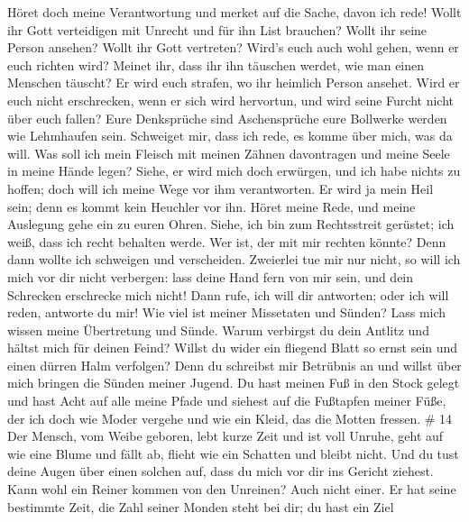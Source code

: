 Höret doch meine Verantwortung und merket auf die Sache,
davon ich rede!  Wollt ihr Gott verteidigen mit Unrecht und
für ihn List brauchen?  Wollt ihr seine Person ansehen?
Wollt ihr Gott vertreten?  Wird's euch auch wohl gehen, wenn
er euch richten wird? Meinet ihr, dass ihr ihn täuschen werdet, wie man
einen Menschen täuscht?  Er wird euch strafen, wo ihr
heimlich Person ansehet.  Wird er euch nicht erschrecken,
wenn er sich wird hervortun, und wird seine Furcht nicht über euch
fallen?  Eure Denksprüche sind Aschensprüche eure Bollwerke
werden wie Lehmhaufen sein.  Schweiget mir, dass ich rede,
es komme über mich, was da will.  Was soll ich mein Fleisch
mit meinen Zähnen davontragen und meine Seele in meine Hände legen?
 Siehe, er wird mich doch erwürgen, und ich habe nichts zu
hoffen; doch will ich meine Wege vor ihm verantworten.  Er
wird ja mein Heil sein; denn es kommt kein Heuchler vor ihn.
 Höret meine Rede, und meine Auslegung gehe ein zu euren
Ohren.  Siehe, ich bin zum Rechtsstreit gerüstet; ich weiß,
dass ich recht behalten werde.  Wer ist, der mit mir
rechten könnte? Denn dann wollte ich schweigen und verscheiden.
 Zweierlei tue mir nur nicht, so will ich mich vor dir
nicht verbergen:  lass deine Hand fern von mir sein, und
dein Schrecken erschrecke mich nicht!  Dann rufe, ich will
dir antworten; oder ich will reden, antworte du mir!  Wie
viel ist meiner Missetaten und Sünden? Lass mich wissen meine
Übertretung und Sünde.  Warum verbirgst du dein Antlitz und
hältst mich für deinen Feind?  Willst du wider ein fliegend
Blatt so ernst sein und einen dürren Halm verfolgen?  Denn
du schreibst mir Betrübnis an und willst über mich bringen die Sünden
meiner Jugend.  Du hast meinen Fuß in den Stock gelegt und
hast Acht auf alle meine Pfade und siehest auf die Fußtapfen meiner
Füße,  der ich doch wie Moder vergehe und wie ein Kleid,
das die Motten fressen. \# 14  Der Mensch, vom Weibe
geboren, lebt kurze Zeit und ist voll Unruhe,  geht auf wie
eine Blume und fällt ab, flieht wie ein Schatten und bleibt nicht.
 Und du tust deine Augen über einen solchen auf, dass du
mich vor dir ins Gericht ziehest.  Kann wohl ein Reiner
kommen von den Unreinen? Auch nicht einer.  Er hat seine
bestimmte Zeit, die Zahl seiner Monden steht bei dir; du hast ein Ziel
